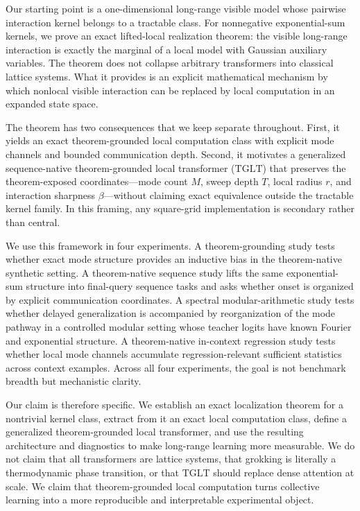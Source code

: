 \documentclass[11pt]{article}
\theoremstyle{definition}
\newcommand{\TGLT}{\ensuremath{\mathrm{TGLT}}}
\begin{document}
Our starting point is a one-dimensional long-range visible model whose pairwise interaction kernel belongs to a tractable class. For nonnegative exponential-sum kernels, we prove an exact lifted-local realization theorem: the visible long-range interaction is exactly the marginal of a local model with Gaussian auxiliary variables. The theorem does not collapse arbitrary transformers into classical lattice systems. What it provides is an explicit mathematical mechanism by which nonlocal visible interaction can be replaced by local computation in an expanded state space.

The theorem has two consequences that we keep separate throughout. First, it yields an exact theorem-grounded local computation class with explicit mode channels and bounded communication depth. Second, it motivates a generalized sequence-native theorem-grounded local transformer (\TGLT) that preserves the theorem-exposed coordinates---mode count \(M\), sweep depth \(T\), local radius \(r\), and interaction sharpness \(\beta\)---without claiming exact equivalence outside the tractable kernel family. In this framing, any square-grid implementation is secondary rather than central.

We use this framework in four experiments. A theorem-grounding study tests whether exact mode structure provides an inductive bias in the theorem-native synthetic setting. A theorem-native sequence study lifts the same exponential-sum structure into final-query sequence tasks and asks whether onset is organized by explicit communication coordinates. A spectral modular-arithmetic study tests whether delayed generalization is accompanied by reorganization of the mode pathway in a controlled modular setting whose teacher logits have known Fourier and exponential structure. A theorem-native in-context regression study tests whether local mode channels accumulate regression-relevant sufficient statistics across context examples. Across all four experiments, the goal is not benchmark breadth but mechanistic clarity.

Our claim is therefore specific. We establish an exact localization theorem for a nontrivial kernel class, extract from it an exact local computation class, define a generalized theorem-grounded local transformer, and use the resulting architecture and diagnostics to make long-range learning more measurable. We do not claim that all transformers are lattice systems, that grokking is literally a thermodynamic phase transition, or that \TGLT{} should replace dense attention at scale. We claim that theorem-grounded local computation turns collective learning into a more reproducible and interpretable experimental object.
\end{document}
